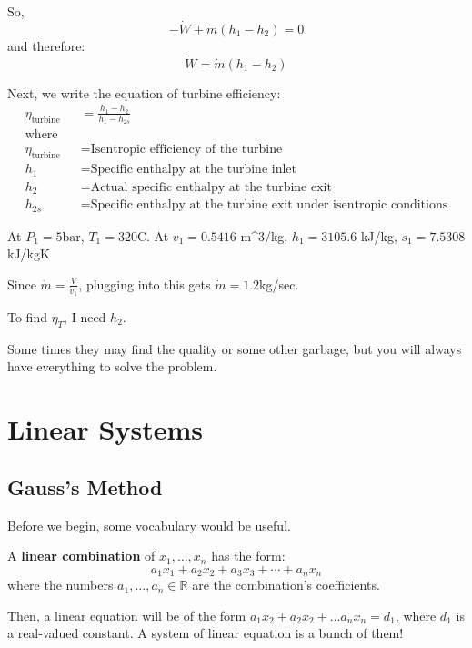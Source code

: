 \documentclass{article}
\begin{document}
So, 
\[- \dot W + \dot m(h_1 - h_2)  = 0\]
and therefore:
\[\dot W = \dot m(h_1 - h_2)\]

Next, we write the equation of turbine efficiency:
\[
  \begin{align*}
\eta_{\text{turbine}} &= \frac{h_1 - h_2}{h_1 - h_{2s}} \\[5pt]
\text{where} \quad & \\
\eta_{\text{turbine}} & = \text{Isentropic efficiency of the turbine} \\
h_1 & = \text{Specific enthalpy at the turbine inlet} \\
h_2 & = \text{Actual specific enthalpy at the turbine exit} \\
h_{2s} & = \text{Specific enthalpy at the turbine exit under isentropic conditions}
\end{align*}
\]

At $P_1 = 5 \text{bar}$, $T_1 = 320$C. At $v_1 = 0.5416$ m^3/kg, $h_1 = 3105.6$ kJ/kg, $s_1 = 7.5308$ kJ/kgK

Since $\dot m = \frac{V}{\dot v_1}$, plugging into this gets $\dot m = 1.2$kg/sec.

To find $\eta_T$, I need $h_2$. 

















Some times they may find the quality or some other garbage, but you will always have everything to solve the problem.
\section{Linear Systems}

\subsection{Gauss's Method}
Before we begin, some vocabulary would be useful. 
\begin{definition}
A \textbf{linear combination} of $x_1, \ldots, x_n$ has the form:
\[
a_1x_1 + a_2x_2 + a_3x_3 + \cdots + a_nx_n
\]
where the numbers $a_1, \ldots, a_n \in \mathbb{R}$ are the combination's coefficients.
\end{definition}
Then, a linear equation will be of the form $a_1x_2 + a_2x_2 + \dots a_nx_n = d_1$, where $d_1$ is a real-valued constant. A system of linear equation is a bunch of them!
\end{document}
